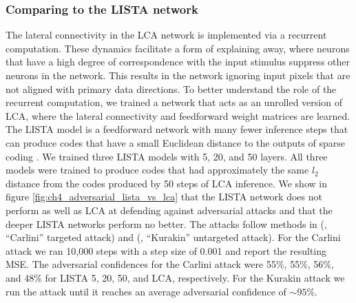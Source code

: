 \subsubsection{Comparing to the LISTA network}
The lateral connectivity in the LCA network is implemented via a recurrent computation. These dynamics facilitate a form of explaining away, where neurons that have a high degree of correspondence with the input stimulus suppress other neurons in the network. This results in the network ignoring input pixels that are not aligned with primary data directions. To better understand the role of the recurrent computation, we trained a network that acts as an unrolled version of LCA, where the lateral connectivity and feedforward weight matrices are learned. The LISTA model is a feedforward network with many fewer inference steps that can produce codes that have a small Euclidean distance to the outputs of sparse coding \parencite{gregor2010learning}. We trained three LISTA models with 5, 20, and 50 layers. All three models were trained to produce codes that had approximately the same $l_{2}$ distance from the codes produced by 50 steps of LCA inference. We show in figure \ref{fig:ch4_adversarial_lista_vs_lca} that the LISTA network does not perform as well as LCA at defending against adversarial attacks and that the deeper LISTA networks perform no better. The attacks follow methods in (\cite{carlini2017towards}, ``Carlini'' targeted attack) and (\cite{kurakin2016adversarial}, ``Kurakin'' untargeted attack). For the Carlini attack we ran 10,000 steps with a step size of 0.001 and report the resulting MSE. The adversarial confidences for the Carlini attack were 55\%, 55\%, 56\%, and 48\% for LISTA 5, 20, 50, and LCA, respectively. For the Kurakin attack we run the attack until it reaches an average adversarial confidence of $\sim 95$\%. 

